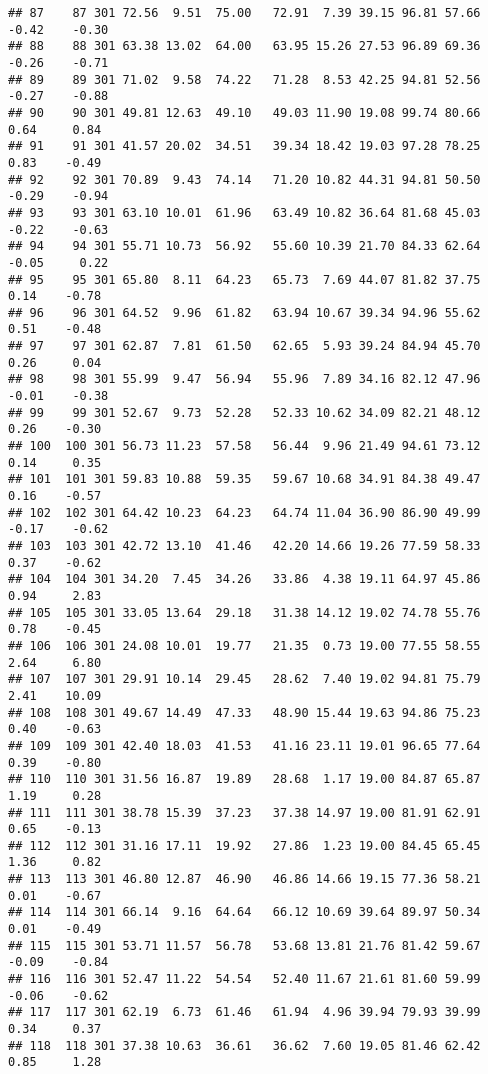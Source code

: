 \documentclass[
]{article}
\begin{document}
\begin{verbatim}
## 87    87 301 72.56  9.51  75.00   72.91  7.39 39.15 96.81 57.66 -0.42    -0.30
## 88    88 301 63.38 13.02  64.00   63.95 15.26 27.53 96.89 69.36 -0.26    -0.71
## 89    89 301 71.02  9.58  74.22   71.28  8.53 42.25 94.81 52.56 -0.27    -0.88
## 90    90 301 49.81 12.63  49.10   49.03 11.90 19.08 99.74 80.66  0.64     0.84
## 91    91 301 41.57 20.02  34.51   39.34 18.42 19.03 97.28 78.25  0.83    -0.49
## 92    92 301 70.89  9.43  74.14   71.20 10.82 44.31 94.81 50.50 -0.29    -0.94
## 93    93 301 63.10 10.01  61.96   63.49 10.82 36.64 81.68 45.03 -0.22    -0.63
## 94    94 301 55.71 10.73  56.92   55.60 10.39 21.70 84.33 62.64 -0.05     0.22
## 95    95 301 65.80  8.11  64.23   65.73  7.69 44.07 81.82 37.75  0.14    -0.78
## 96    96 301 64.52  9.96  61.82   63.94 10.67 39.34 94.96 55.62  0.51    -0.48
## 97    97 301 62.87  7.81  61.50   62.65  5.93 39.24 84.94 45.70  0.26     0.04
## 98    98 301 55.99  9.47  56.94   55.96  7.89 34.16 82.12 47.96 -0.01    -0.38
## 99    99 301 52.67  9.73  52.28   52.33 10.62 34.09 82.21 48.12  0.26    -0.30
## 100  100 301 56.73 11.23  57.58   56.44  9.96 21.49 94.61 73.12  0.14     0.35
## 101  101 301 59.83 10.88  59.35   59.67 10.68 34.91 84.38 49.47  0.16    -0.57
## 102  102 301 64.42 10.23  64.23   64.74 11.04 36.90 86.90 49.99 -0.17    -0.62
## 103  103 301 42.72 13.10  41.46   42.20 14.66 19.26 77.59 58.33  0.37    -0.62
## 104  104 301 34.20  7.45  34.26   33.86  4.38 19.11 64.97 45.86  0.94     2.83
## 105  105 301 33.05 13.64  29.18   31.38 14.12 19.02 74.78 55.76  0.78    -0.45
## 106  106 301 24.08 10.01  19.77   21.35  0.73 19.00 77.55 58.55  2.64     6.80
## 107  107 301 29.91 10.14  29.45   28.62  7.40 19.02 94.81 75.79  2.41    10.09
## 108  108 301 49.67 14.49  47.33   48.90 15.44 19.63 94.86 75.23  0.40    -0.63
## 109  109 301 42.40 18.03  41.53   41.16 23.11 19.01 96.65 77.64  0.39    -0.80
## 110  110 301 31.56 16.87  19.89   28.68  1.17 19.00 84.87 65.87  1.19     0.28
## 111  111 301 38.78 15.39  37.23   37.38 14.97 19.00 81.91 62.91  0.65    -0.13
## 112  112 301 31.16 17.11  19.92   27.86  1.23 19.00 84.45 65.45  1.36     0.82
## 113  113 301 46.80 12.87  46.90   46.86 14.66 19.15 77.36 58.21  0.01    -0.67
## 114  114 301 66.14  9.16  64.64   66.12 10.69 39.64 89.97 50.34  0.01    -0.49
## 115  115 301 53.71 11.57  56.78   53.68 13.81 21.76 81.42 59.67 -0.09    -0.84
## 116  116 301 52.47 11.22  54.54   52.40 11.67 21.61 81.60 59.99 -0.06    -0.62
## 117  117 301 62.19  6.73  61.46   61.94  4.96 39.94 79.93 39.99  0.34     0.37
## 118  118 301 37.38 10.63  36.61   36.62  7.60 19.05 81.46 62.42  0.85     1.28

\end{verbatim}
\end{document}
